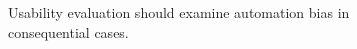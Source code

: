 \begin{figure}[H]
\centering
{}
\caption{Usability evaluation should examine automation bias in consequential cases.}\label{fig:teach-M09-11}
\end{figure}
